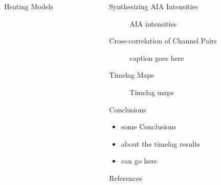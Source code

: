 \documentclass[final]{beamer}
\begin{document}
\begin{frame}
\begin{columns}[T]
\begin{column}{0.49\linewidth}
\begin{block}{Heating Models}
\begin{columns}[T]
\begin{column}{0.49\columnwidth}
\begin{figure}
        \end{figure}
      \end{column}
      \end{columns}
    \end{block}
  \end{column}
  \begin{column}{0.49\linewidth}
    \begin{block}{Synthesizing AIA Intensities}
      \begin{figure}
        \caption{AIA intensities} 
        \label{fig:total_em_map}
      \end{figure}
    \end{block}
    \begin{block}{Cross-correlation of Channel Pairs}
      \begin{figure}
        \caption{caption goes here}
        \label{fig:em_1d}
      \end{figure}
    \end{block}
    \begin{block}{Timelag Maps}
      \begin{figure}
        \caption{Timelag maps}
        \label{fig:em_slope_maps}
      \end{figure}
    \end{block}
    \begin{block}{Conclusions}
      \begin{itemize}
        \item some Conclusions
        \item about the timelag results
        \item can go here
      \end{itemize}
    \end{block}
    \begin{block}{References}
      \scriptsize
      \begin{multicols}{2}
        
        
      \end{multicols}
    \end{block}
  \end{column}
  \end{columns}
\end{frame}
\end{document}
